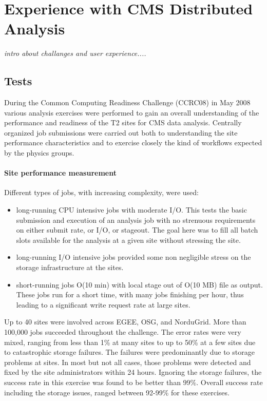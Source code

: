 \section{Experience with CMS Distributed Analysis}
\label{sec:5}
\emph{intro about challanges and user experience....}

\subsection{Tests}
\label{sec:5_1}
During the Common Computing Readiness Challenge (CCRC08) in May 2008
various analysis exercises were performed to gain an overall understanding 
of the performance and readiness of the T2 sites for CMS data analysis.
Centrally organized job submissions were carried out both to understanding the site performance characteristics and to exercise closely the kind of workflows
expected by the physics groups.
\paragraph{Site performance measurement}
Different types of jobs, with increasing complexity, were used:
\begin{itemize}
\item long-running CPU intensive jobs with moderate I/O. This tests the basic submission and execution of an analysis job with no strenuous requirements on 
either submit rate, or I/O, or stageout. The goal here was to fill all batch slots available for the analysis at a given site without stressing the site.
\item long-running I/O intensive jobs provided some non negligible stress on 
the storage infrastructure at the sites.
\item short-running jobs O(10 min) with local stage out of O(10 MB) file as output. These jobs run for a short time, with many jobs finishing per hour, thus leading to a significant write request rate at large sites.
\end{itemize}
Up to 40 sites were involved across EGEE, OSG, and NorduGrid. More than 100,000 jobs succeeded throughout the challenge. The error rates were very mixed, ranging from less than 1\% at many sites to up to 50\% at a few sites due to
catastrophic storage failures. The failures were predominantly
due to storage problems at sites. In most but not all cases, those problems were detected and fixed by the site administrators within 24 hours. Ignoring the storage failures, the success rate in this exercise was found to be better than 99\%. Overall success rate including the storage issues, ranged between 92-99\% for these exercises.

